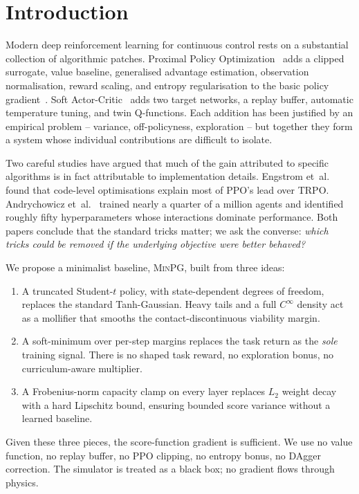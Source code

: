 \section{Introduction}
\label{sec:intro}

Modern deep reinforcement learning for continuous control rests on a
substantial collection of algorithmic patches. Proximal Policy
Optimization~\cite{schulman2017ppo} adds a clipped surrogate, value
baseline, generalised advantage estimation, observation
normalisation, reward scaling, and entropy regularisation to the
basic policy gradient~\cite{williams1992}. Soft
Actor-Critic~\cite{haarnoja2018sac} adds two target networks, a
replay buffer, automatic temperature tuning, and twin Q-functions.
Each addition has been justified by an empirical problem -- variance,
off-policyness, exploration -- but together they form a system whose
individual contributions are difficult to isolate.

Two careful studies have argued that much of the gain attributed to
specific algorithms is in fact attributable to implementation
details. Engstrom et~al.~\cite{engstrom2020} found that code-level
optimisations explain most of PPO's lead over TRPO.
Andrychowicz et~al.~\cite{andrychowicz2021} trained nearly a quarter
of a million agents and identified roughly fifty hyperparameters
whose interactions dominate performance. Both papers conclude that
the standard tricks matter; we ask the converse:
\emph{which tricks could be removed if the underlying objective were
better behaved?}

We propose a minimalist baseline, \textsc{MinPG}, built from three
ideas:
\begin{enumerate}[leftmargin=*]
  \item A truncated Student-$t$ policy, with state-dependent degrees of
    freedom, replaces the standard Tanh-Gaussian. Heavy tails and a
    full $C^\infty$ density act as a mollifier that smooths the
    contact-discontinuous viability margin.
  \item A soft-minimum over per-step margins replaces the task return
    as the \emph{sole} training signal. There is no shaped task
    reward, no exploration bonus, no curriculum-aware multiplier.
  \item A Frobenius-norm capacity clamp on every layer replaces $L_2$
    weight decay with a hard Lipschitz bound, ensuring bounded score
    variance without a learned baseline.
\end{enumerate}
Given these three pieces, the score-function gradient is sufficient.
We use no value function, no replay buffer, no PPO clipping, no
entropy bonus, no DAgger correction. The simulator is treated as a
black box; no gradient flows through physics.

